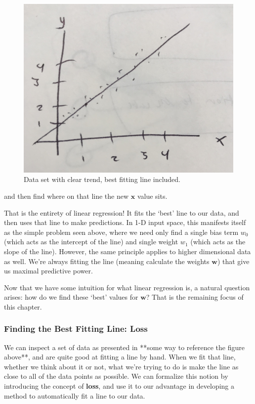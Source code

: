\begin{figure}[H]
    \centering
    \includegraphics[width=0.5\paperwidth]{../LinearRegression/fig/simple_lin_reg_w_line.jpg}
    \caption{Data set with clear trend, best fitting line included.}
    \label{fig:simple-lin-reg-w-line}
\end{figure}

and then find where on that line the new $\textbf{x}$ value sits.

That is the entirety of linear regression! It fits the `best' line to our data, and then uses that line to make predictions. In 1-D input space, this manifests itself as the simple problem seen above, where we need only find a single bias term $w_{0}$ (which acts as the intercept of the line) and single weight $w_{1}$ (which acts as the slope of the line). However, the same principle applies to higher dimensional data as well. We're always fitting the line (meaning calculate the weights $\textbf{w}$) that give us maximal predictive power.


Now that we have some intuition for what linear regression is, a natural question arises: how do we find these `best' values for $\textbf{w}$? That is the remaining focus of this chapter.

\subsubsection{Finding the Best Fitting Line: Loss}
We can inspect a set of data as presented in **some way to reference the figure above**, and are quite good at fitting a line by hand. When we fit that line, whether we think about it or not, what we're trying to do is make the line as close to all of the data points as possible. We can formalize this notion by introducing the concept of \textbf{loss}, and use it to our advantage in developing a method to automatically fit a line to our data.


